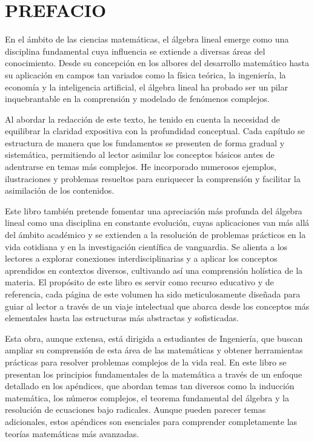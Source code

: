 \chapter*{PREFACIO}

En el ámbito de las ciencias matemáticas, el álgebra lineal emerge como una disciplina fundamental cuya influencia se extiende a diversas áreas del conocimiento. Desde su concepción en los albores del desarrollo matemático hasta su aplicación en campos tan variados como la física teórica, la ingeniería, la economía y la inteligencia artificial, el álgebra lineal ha probado ser un pilar inquebrantable en la comprensión y modelado de fenómenos complejos.

Al abordar la redacción de este texto, he tenido en cuenta la necesidad de equilibrar la claridad expositiva con la profundidad conceptual. Cada capítulo se estructura de manera que los fundamentos se presenten de forma gradual y sistemática, permitiendo al lector asimilar los conceptos básicos antes de adentrarse en temas más complejos. He incorporado numerosos ejemplos, ilustraciones y problemas resueltos para enriquecer la comprensión y facilitar la asimilación de los contenidos.

Este libro también pretende fomentar una apreciación más profunda del álgebra lineal como una disciplina en constante evolución, cuyas aplicaciones van más allá del ámbito académico y se extienden a la resolución de problemas prácticos en la vida cotidiana y en la investigación científica de vanguardia. Se alienta a los lectores a explorar conexiones interdisciplinarias y a aplicar los conceptos aprendidos en contextos diversos, cultivando así una comprensión holística de la materia. El propósito de este libro es servir como recurso educativo y de referencia, cada página de este volumen ha sido meticulosamente diseñada para guiar al lector a través de un viaje intelectual que abarca desde los conceptos más elementales hasta las estructuras más abstractas y sofisticadas.

Esta obra, aunque extensa, está dirigida a estudiantes de Ingeniería, que buscan ampliar su comprensión de esta área de las matemáticas y obtener herramientas prácticas para resolver problemas complejos de la vida real. En este libro se presentan los principios fundamentales de la matemática a través de un enfoque detallado en los apéndices, que abordan temas tan diversos como la inducción matemática, los números complejos, el teorema fundamental del álgebra y la resolución de ecuaciones bajo radicales. Aunque pueden parecer temas adicionales, estos apéndices son esenciales para comprender completamente las teorías matemáticas más avanzadas.

